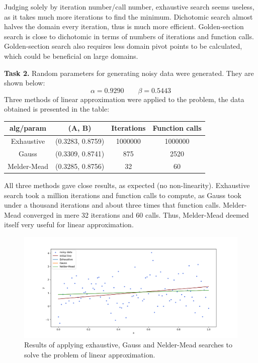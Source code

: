 \documentclass[12pt, a4paper]{article}
\begin{document}
Judging solely by iteration number/call number, exhaustive search seems useless, as it takes much more iterations to find the minimum. Dichotomic search almost halves the domain every iteration, thus is much more efficient. Golden-section search is close to dichotomic in terms of numbers of iterations and function calls. Golden-section search also requires less domain pivot points to be calculated, which could be beneficial on large domains.

\textbf{Task 2.} Random parameters for generating noisy data were generated. They are shown below:
\[ \alpha = 0.9290 \qquad \beta = 0.5443 \]
Three methods of linear approximation were applied to the problem, the data obtained is presented in the table:
\begin{center}
\begin{tabular}{cccc}
\hline
alg/param   & (A, B)           & Iterations & Function calls \\ \hline
Exhaustive  & (0.3283, 0.8759) & 1000000    & 1000000        \\
Gauss       & (0.3309, 0.8741) & 875        & 2520           \\
Melder-Mead & (0.3285, 0.8756) & 32         & 60             \\ \hline
\end{tabular}
\end{center}
All three methods gave close results, as expected (no non-linearity). Exhaustive search took a million iterations and function calls to compute, as Gauss took under a thousand iterations and about three times that function calls. Melder-Mead converged in mere 32 iterations and 60 calls. Thus, Melder-Mead deemed itself very useful for linear approximation.

\newpage

\begin{figure}[!h]
\centering
\includegraphics[width=\textwidth]{line1.png}
\caption{Results of applying exhaustive, Gauss and Nelder-Mead searches to solve the problem of linear approximation.}
\end{figure}
\end{document}
